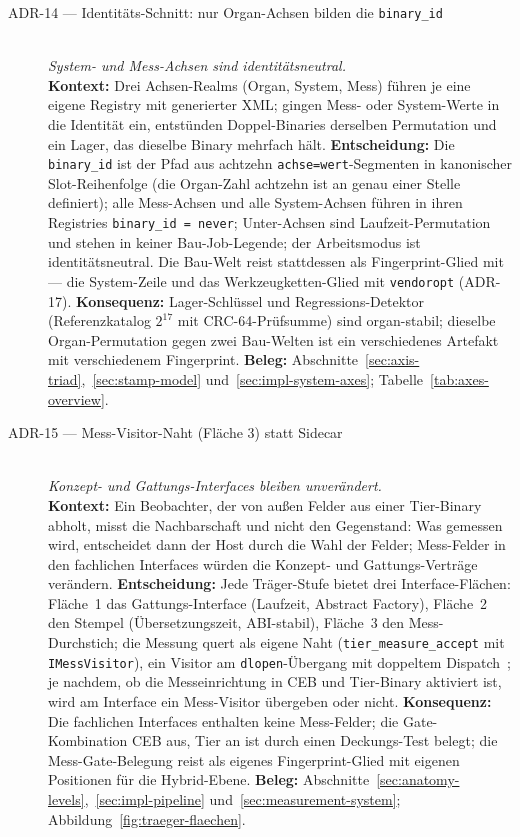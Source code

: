 \begin{description}
  \item[ADR-14 --- Identitäts-Schnitt: nur Organ-Achsen bilden die \texttt{binary\_id}]\hfill\\
  \emph{System- und Mess-Achsen sind identitätsneutral.}\hfill\\
  \textbf{Kontext:} Drei Achsen-Realms (Organ, System, Mess) führen je eine eigene Registry mit
  generierter XML\@; gingen Mess- oder System-Werte in die Identität ein, entstünden Doppel-Binaries
  derselben Permutation und ein Lager, das dieselbe Binary mehrfach hält.
  \textbf{Entscheidung:} Die \texttt{binary\_id} ist der Pfad aus achtzehn \texttt{achse=wert}-Segmenten
  in kanonischer Slot-Reihenfolge (die Organ-Zahl achtzehn ist an genau einer Stelle definiert); alle Mess-Achsen
  und alle System-Achsen führen in ihren Registries \texttt{binary\_id = never}; Unter-Achsen sind
  Laufzeit-Permutation und stehen in keiner Bau-Job-Legende; der Arbeitsmodus ist identitätsneutral.
  Die Bau-Welt reist stattdessen als Fingerprint-Glied mit --- die System-Zeile und das
  Werkzeugketten-Glied mit \texttt{vendoropt} (ADR-17).
  \textbf{Konsequenz:} Lager-Schlüssel und Regressions-Detektor (Referenzkatalog $2^{17}$ mit
  CRC-64-Prüfsumme) sind organ-stabil; dieselbe Organ-Permutation gegen zwei Bau-Welten ist ein
  verschiedenes Artefakt mit verschiedenem Fingerprint.
  \textbf{Beleg:} Abschnitte~\ref{sec:axis-triad},~\ref{sec:stamp-model}
  und~\ref{sec:impl-system-axes}; Tabelle~\ref{tab:axes-overview}.

  \item[ADR-15 --- Mess-Visitor-Naht (Fläche 3) statt Sidecar]\hfill\\
  \emph{Konzept- und Gattungs-Interfaces bleiben unverändert.}\hfill\\
  \textbf{Kontext:} Ein Beobachter, der von außen Felder aus einer Tier-Binary abholt, misst die
  Nachbarschaft und nicht den Gegenstand: Was gemessen wird, entscheidet dann der Host durch die Wahl
  der Felder; Mess-Felder in den fachlichen Interfaces würden die Konzept- und Gattungs-Verträge
  verändern.
  \textbf{Entscheidung:} Jede Träger-Stufe bietet drei Interface-Flächen: Fläche~1 das
  Gattungs-Interface (Laufzeit, Abstract Factory), Fläche~2 den Stempel (Übersetzungszeit, ABI-stabil),
  Fläche~3 den Mess-Durchstich; die Messung quert als eigene Naht
  (\texttt{tier\_measure\_accept} mit \texttt{IMessVisitor}), ein Visitor am
  \texttt{dlopen}-Übergang mit doppeltem Dispatch~\cite{gamma1994patterns}; je nachdem, ob die
  Messeinrichtung in CEB und Tier-Binary aktiviert ist, wird am Interface ein Mess-Visitor übergeben
  oder nicht.
  \textbf{Konsequenz:} Die fachlichen Interfaces enthalten keine Mess-Felder; die Gate-Kombination CEB
  aus, Tier an ist durch einen Deckungs-Test belegt; die Mess-Gate-Belegung reist als eigenes
  Fingerprint-Glied mit eigenen Positionen für die Hybrid-Ebene.
  \textbf{Beleg:} Abschnitte~\ref{sec:anatomy-levels},~\ref{sec:impl-pipeline}
  und~\ref{sec:measurement-system}; Abbildung~\ref{fig:traeger-flaechen}.


\end{description}
